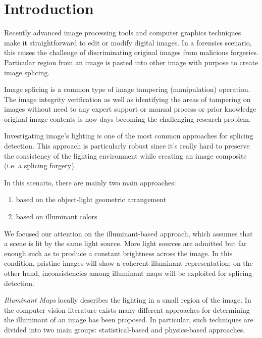 \chapter*{Introduction}

Recently advanced image processing tools and computer graphics techniques make it straightforward to edit or modify digital images. In a forensics scenario, this raises the challenge of discriminating original images from malicious forgeries. Particular region from an image is pasted into other image with purpose to create image splicing. 

Image splicing is a common type of image tampering (manipulation) operation. The image integrity verification as well as identifying the areas of tampering on images without need to any expert support or manual process or prior knowledge original image contents is now days becoming the challenging research problem.

Investigating image's lighting is one of the most common approaches for splicing detection. This approach is particularly robust since it's really hard to preserve the consistency of the lighting environment while creating an image composite (i.e. a splicing forgery). 

In this scenario, there are mainly two main approaches:
\begin{enumerate}
\item based on the object-light geometric arrangement
\item based on illuminant colors
\end{enumerate}

We focused our attention on the illuminant-based approach, which assumes that a scene is lit by the same light source. More light sources are admitted but far enough such as to produce a constant brightness across the image. In this condition, pristine images will show a coherent illuminant representation; on the other hand, inconsistencies among illuminant maps will be exploited for splicing detection. 

\emph{Illuminant Maps} locally describes the lighting in a small region of the image. In the computer vision literature exists many different approaches for determining the illuminant of an image has been proposed. In particular, such techniques are divided into two main groups: statistical-based and physics-based approaches.

